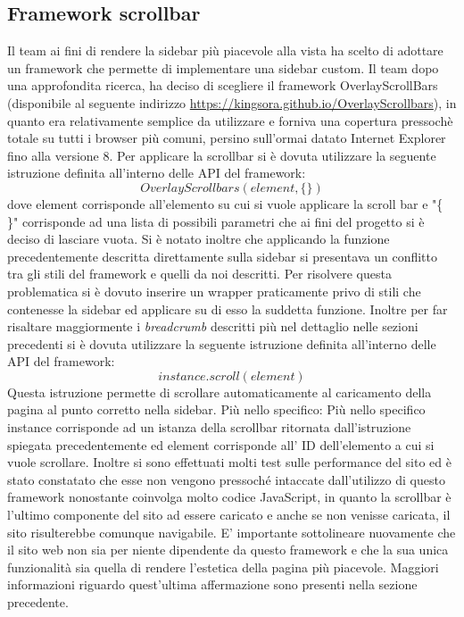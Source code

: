 \documentclass[12pt]{article}
\begin{document}
	\subsection{Framework scrollbar}
	Il team ai fini di rendere la sidebar più piacevole alla vista ha scelto di adottare un framework che permette di implementare una sidebar custom. Il team dopo una approfondita ricerca, ha deciso di scegliere il framework OverlayScrollBars (disponibile al seguente indirizzo \url{https://kingsora.github.io/OverlayScrollbars}), in quanto era relativamente semplice da utilizzare e forniva una copertura pressochè totale su tutti i browser più comuni, persino sull'ormai datato Internet Explorer fino alla versione 8.
	Per applicare la scrollbar si è dovuta utilizzare la seguente istruzione definita all'interno delle API del framework:
	\[ OverlayScrollbars(element, \{ \}) \]
	dove element corrisponde all'elemento su cui si vuole applicare la scroll bar e "\{ \}" corrisponde ad una lista di possibili parametri che ai fini del progetto si è deciso di lasciare vuota.
	Si è notato inoltre che applicando la funzione precedentemente descritta direttamente sulla sidebar si presentava un conflitto tra gli stili del framework e quelli da noi descritti. Per risolvere questa problematica si è dovuto inserire un wrapper praticamente privo di stili che contenesse la sidebar ed applicare su di esso la suddetta funzione.
	Inoltre per far risaltare maggiormente i \emph{breadcrumb} descritti più nel dettaglio nelle sezioni precedenti si è dovuta utilizzare la seguente istruzione definita all'interno delle API del framework:
	\[ instance.scroll(element) \]
	Questa istruzione permette di scrollare automaticamente al caricamento della pagina al punto corretto nella sidebar. Più nello specifico:
	Più nello specifico instance corrisponde ad un istanza della scrollbar ritornata dall'istruzione spiegata precedentemente ed element corrisponde all' ID dell'elemento a cui si vuole scrollare.
	Inoltre si sono effettuati molti test sulle performance del sito ed è stato constatato che esse non vengono pressoché intaccate dall'utilizzo di questo framework nonostante coinvolga molto codice JavaScript, in quanto la scrollbar è l'ultimo componente del sito ad essere caricato e anche se non venisse caricata, il sito risulterebbe comunque navigabile.
	E' importante sottolineare nuovamente che il sito web non sia per niente dipendente da questo framework e che la sua unica funzionalità sia quella di rendere l'estetica della pagina più piacevole. Maggiori informazioni riguardo quest'ultima affermazione sono presenti nella sezione precedente.
\end{document}
